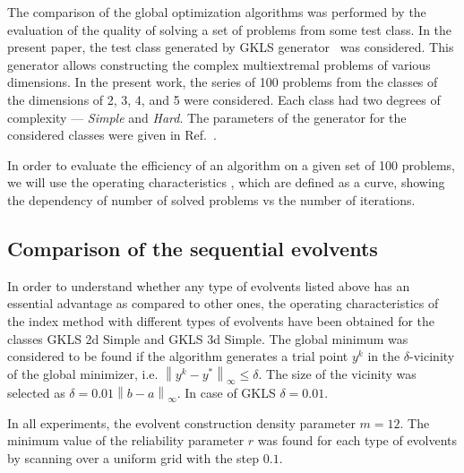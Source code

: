 \documentclass[3p,times,procedia]{elsarticle}
\begin{document}
The comparison of the global optimization algorithms was performed by the evaluation of the
quality of solving a set of problems from some test class.
In the present paper, the test class generated by GKLS generator~\cite{Gaviano2003} was
considered. This generator allows constructing the complex multiextremal problems of various
dimensions. In the present work, the series of 100 problems from the classes of the dimensions
of 2, 3, 4, and 5 were considered.
Each class had two degrees of complexity --- \textit{Simple} and \textit{Hard}. The parameters
of the generator for the considered classes were given in Ref.~\cite{Gaviano2003}.

In order to evaluate the efficiency of an algorithm on a given set of 100 problems, we will use
the operating characteristics \cite{grishaginClass}, which are defined as a
curve, showing the dependency of number of solved problems vs the number of iterations.

\subsection{Comparison of the sequential evolvents}
\label{sec:seq_comp}
In order to understand whether any type of evolvents listed above has an essential advantage as
compared to other ones, the operating characteristics of the index method with different types
of evolvents have been obtained for the classes GKLS 2d Simple and GKLS 3d Simple. The
global minimum was considered to be found if the algorithm generates a trial point $y^k$ in the
$\delta$-vicinity of the global minimizer, i.e. $\left\|y^k-y^\ast\right\|_\infty\leq\delta$. The size
of the vicinity was selected as $\delta = 0.01\left\|b-a\right\|_\infty$. In case of GKLS
$\delta=0.01$.

In all experiments, the evolvent construction density parameter $m=12$. The minimum value of
the reliability parameter \(r\) was found for each type of evolvents by scanning over a uniform grid
with the step \(0.1\).
\end{document}
